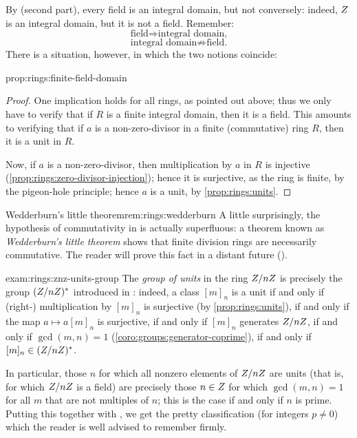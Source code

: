 By  (second part), every field is an integral
domain, but not conversely: indeed, $Z$ is an integral domain, but it
is not a field. Remember:
\[
  \text{field} \Rightarrow \text{integral domain,}
\]
\[
  \text{integral domain} \not\Rightarrow \text{field.}
\]
There is a situation, however, in which the two notions coincide:
\begin{prop}{}{prop:rings:finite-field-domain}
\end{prop}
\begin{proof}
  One implication holds for all rings, as pointed out above; thus we
  only have to verify that if $R$ is a finite integral domain, then it
  is a field. This amounts to verifying that if $a$ is a
  non-zero-divisor in a finite (commutative) ring $R$, then it is a
  unit in $R$.

  Now, if $a$ is a non-zero-divisor, then multiplication by $a$ in $R$
  is injective (\cref{prop:rings:zero-divisor-injection}); hence it is
  surjective, as the ring is finite, by the pigeon-hole principle;
  hence $a$ is a unit, by \cref{prop:rings:units}.
\end{proof}
\begin{rem}{Wedderburn's little theorem}{rem:rings:wedderburn}
  A little surprisingly, the hypothesis of commutativity in
   is actually superfluous: a
  theorem known as \emph{Wedderburn's little theorem} shows that
  finite division rings are necessarily commutative. The reader will
  prove this fact in a distant future
  ().
\end{rem}
\begin{exam}{}{exam:rings:znz-units-group}
  The \emph{group of units} in the ring $Z/nZ$ is precisely the
  group $(Z/nZ)^*$ introduced in
  :
  indeed, a class $[m]_n$ is a unit if and only if (right-)
  multiplication by $[m]_n$ is surjective (by
  \cref{prop:rings:units}), if and only if the map $a \mapsto a[m]_n$
  is surjective, if and only if $[m]_n$ generates $Z/nZ$, if and
  only if $\gcd(m, n) = 1$ (\cref{coro:groups:generator-coprime}), if
  and only if $[m]_n \in (Z/nZ)^*$.

  In particular, those $n$ for which all nonzero elements of $Z/nZ$
  are units (that is, for which $Z/nZ$ is a field) are precisely
  those $n \in Z$ for which $\gcd(m, n) = 1$ for all $m$ that are not
  multiples of $n$; this is the case if and only if $n$ is
  prime. Putting this together with
  , we get the pretty
  classification (for integers $p \neq 0$)
  which the reader is well advised to remember firmly.
\end{exam}

